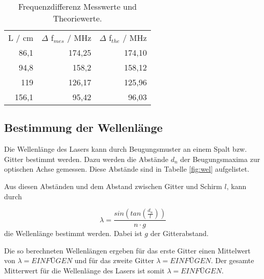 \begin{table}[H]
  \centering
  \footnotesize
  \caption{Frequenzdifferenz Messwerte und Theoriewerte.}
  \label{tab:lon2}
  \begin{tabular}{r r r}
  \toprule
    L / cm & $\Delta$ f$_{mes}$ / MHz & $\Delta$ f$_{the}$ / MHz \\
      86,1 & 174,25 & 174,10 \\
      94,8 & 158,2  & 158,12 \\
      119  & 126,17 & 125,96 \\
      156,1& 95,42  & 96,03  \\
  \bottomrule
  \end{tabular}
\end{table}



\subsection{Bestimmung der Wellenlänge}
\label{sec:Bestimmung der Wellenlänge}
Die Wellenlänge des Lasers kann durch Beugungsmuster an einem Spalt bzw. Gitter bestimmt werden. 
Dazu werden die Abstände $d_n$ der Beugungsmaxima zur optischen Achse gemessen.
Diese Abstände sind in Tabelle \ref{fig:wel} aufgelistet.

Aus diesen Abständen und dem Abstand zwischen Gitter und Schirm $l$, kann durch

\begin{equation}
  \lambda = \frac{sin \left(tan \left(\frac{d_n}{l}\right)\right)}{n \cdot g}
\end{equation}
die Wellenlänge bestimmt werden. Dabei ist $g$ der Gitterabstand. 

Die so berechneten Wellenlängen ergeben für das erste Gitter einen Mittelwert von 
$\lambda = EINFÜGEN$ 
und für das zweite Gitter
$\lambda = EINFÜGEN$.
Der gesamte Mitterwert für die Wellenlänge des Lasers ist somit
$\lambda = EINFÜGEN$.


